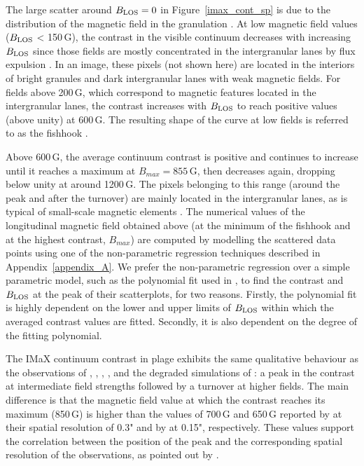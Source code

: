 \documentclass[goettingen, gauss, print]{thesis}
\begin{document}
The large scatter around $B_{\rm LOS}=0$ in Figure~\ref{imax_cont_sp} is due to the distribution of the magnetic field in the granulation \citep{schnerr_brightness_2011}. At low magnetic field values ($B_{\rm LOS}$ < 150\,G), the contrast in the visible continuum decreases with increasing $B_{\rm LOS}$ since those fields are mostly concentrated in the intergranular lanes by flux expulsion \citep{parker_kinematical_1963}. In an image, these pixels (not shown here) are located in the interiors of bright granules and dark intergranular lanes with weak magnetic fields. For fields above 200\,G, which correspond to magnetic features located in the intergranular lanes, the contrast increases with $B_{\rm LOS}$ to reach positive values (above unity) at 600\,G. The resulting shape of the curve at low fields is referred to as the fishhook \citep{schnerr_brightness_2011}.

Above 600\,G, the average continuum contrast is positive and continues to increase until it reaches a maximum at $B_{max}=855$\,G, then decreases again, dropping below unity at around 1200\,G. The pixels belonging to this range (around the peak and after the turnover) are mainly located in the intergranular lanes, as is typical of small-scale magnetic elements \citep{solanki_small-scale_1993}. 
The numerical values of the longitudinal magnetic field obtained above (at the minimum of the fishhook and at the highest contrast, $B_{max}$) are computed by modelling the scattered data points using one of the non-parametric regression techniques described in Appendix~\ref{appendix_A}.
We prefer the non-parametric regression over a simple parametric model, such as the polynomial fit used in \citet{kobel_continuum_2011}, to find the contrast and $B_{\rm LOS}$ at the peak of their scatterplots, for two reasons. Firstly, the polynomial fit is highly dependent on the lower and upper limits of $B_{\rm LOS}$ within which the averaged contrast values are fitted. Secondly, it is also dependent on the degree of the fitting polynomial.

The IMaX continuum contrast in plage exhibits the same qualitative behaviour as the observations of \citet{frazier_multi-channel_1971}, \citet{narayan_small-scale_2010}, \citet{kobel_continuum_2011}, \citet{kostik_properties_2012}, and the degraded simulations of \citet{danilovic_relation_2013}: a peak in the contrast at intermediate field strengths followed by a turnover at higher fields.  The main difference is that the magnetic field value at which the contrast reaches its maximum (850\,G) is higher than the values of 700\,G and 650\,G reported by \citet{kobel_continuum_2011} at their spatial resolution of 0.3" and by \citet{narayan_small-scale_2010} at 0.15", respectively. These values support the correlation between the position of the peak and the corresponding spatial resolution of the observations, as pointed out by \cite{yeo_intensity_2013}. 
\end{document}
